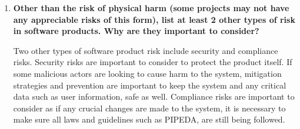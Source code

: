 \documentclass{article}
\begin{document}
\begin{enumerate}
    \item \textbf{Other than the risk of physical harm (some projects may not have any
    appreciable risks of this form), list at least 2 other types of risk in
    software products. Why are they important to consider?}

Two other types of software product risk include security and compliance risks. Security risks are important to consider to protect the product itself. If some malicious actors are looking to cause harm to the system, mitigation strategies and prevention are important to keep the system and any critical data such as user information, safe as well. Compliance risks are important to consider as if any crucial changes are made to the system, it is necessary to make sure all laws and guidelines such as PIPEDA, are still being followed.

\end{enumerate}




\end{document}
